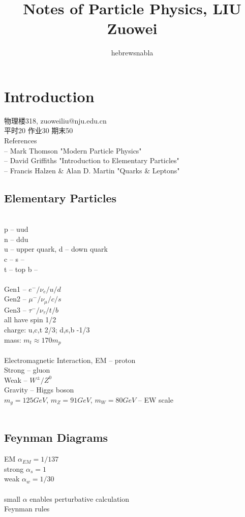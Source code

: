 \documentclass[a4paper]{article}
\title{Notes of Particle Physics, LIU Zuowei}
\author{hebrewsnabla}
\numberwithin{equation}{section}
\begin{document}
\maketitle

\tableofcontents

\newpage

\setcounter{section}{0}
\section{Introduction}
物理楼318, zuoweiliu@nju.edu.cn\\
平时20 作业30 期末50\\

References\\
-- Mark Thomson "Modern Particle Physics"\\
-- David Griffiths "Introduction to Elementary Particles"\\
-- Francis Halzen \& Alan D. Martin "Quarks \& Leptons"\\

\subsection{Elementary Particles}~\\
p -- uud\\
n -- ddu\\
u -- upper quark, d -- down quark\\
c -- s --\\
t -- top b -- \\
~\\
Gen1 -- $ e^-/\nu_e/u/d $\\
Gen2 -- $ \mu^-/\nu_\mu/c/s $\\
Gen3 -- $ \tau^-/\nu_\tau/t/b $\\
all have spin 1/2\\
charge: u,c,t 2/3; d,s,b -1/3\\
mass: $ m_t \approx 170 m_p $\\
~\\
Electromagnetic Interaction, EM -- proton\\
Strong -- gluon\\
Weak -- $ W^\pm/Z^0 $\\
Gravity -- Higgs boson\\
$ m_g = 125GeV $, $ m_Z = 91GeV $, $ m_W = 80GeV $ -- EW scale\\
~\\

\subsection{Feynman Diagrams}
EM $ \alpha_{EM} = 1/137 $\\
strong $ \alpha_s = 1 $\\
weak $ \alpha_w = 1/30 $\\
~\\
small $ \alpha $ enables perturbative calculation\\
Feynman rules\\
\end{document}
